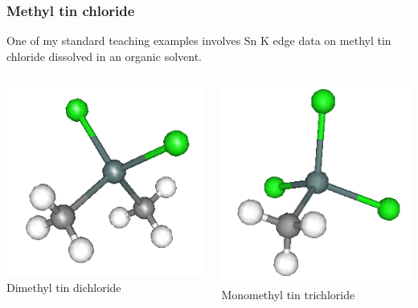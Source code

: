 \documentclass[10pt, xcolor=x11names, compress]{beamer}
\begin{document}
\begin{frame}
  \frametitle{Methyl tin chloride}
  One of my standard teaching examples involves Sn K edge data on
  methyl tin chloride dissolved in an organic solvent.

  \begin{columns}
    \begin{column}{0.5\linewidth}
      \begin{center}
        \includegraphics[width=0.5\linewidth]{images/dimethyltin_dichloride.png}\\
      Dimethyl tin dichloride
      \end{center}
    \end{column}
    \begin{column}{0.5\linewidth}
      \begin{center}
        \includegraphics[width=0.5\linewidth]{images/monomethyltin_trichloride.png}\\
        Monomethyl tin trichloride
      \end{center}
    \end{column}
  \end{columns}
  \begin{columns}
    \begin{column}{0.33\linewidth}

\end{column}
\end{columns}
\end{frame}
\end{document}
